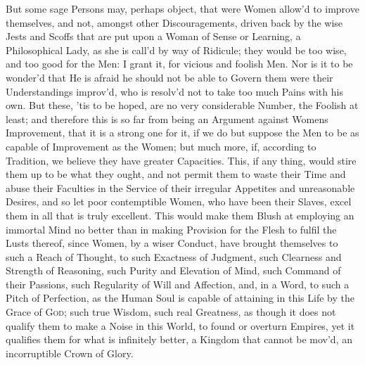 But some sage Persons may, perhaps object, that were Women allow'd to
improve themselves, and not, amongst other Discouragements, driven
back by the  wise Jests and Scoffs that are put upon a Woman
of Sense or Learning, a Philosophical Lady, as she is call'd by way of
Ridicule; they would be too wise, and too good for the Men: I grant
it, for vicious and foolish Men. Nor is it to be wonder'd that He is
afraid he should not be able to Govern them were their Understandings
improv'd, who is resolv'd not to take too much Pains with his own. But
these, 'tis to be hoped, are no very considerable Number, the Foolish
at least; and therefore this is so far from being an Argument against
Womens Improvement, that it is a strong one for it, if we do but
suppose the Men to be as capable of Improvement as the Women; but much
more, if, according to Tradition, we believe they have greater
Capacities. This, if any thing, would stire them up to be what they
ought, and not permit them to waste their Time and abuse their
Faculties in the Service of their irregular Appetites and unreasonable
Desires, and so let poor contemptible Women, who have  been
their Slaves, excel them in all that is truly excellent. This would
make them Blush at employing an immortal Mind no better than in making
Provision for the Flesh to fulfil the Lusts thereof, since Women, by a
wiser Conduct, have brought themselves to such a Reach of Thought, to
such Exactness of Judgment, such Clearness and Strength of Reasoning,
such Purity and Elevation of Mind, such Command of their Passions,
such Regularity of Will and Affection, and, in a Word, to such a Pitch
of Perfection, as the Human Soul is capable of attaining in this Life
by the Grace of \textsc{God}; such true Wisdom, such real Greatness,
as though it does not qualify them to make a Noise in this World, to
found or overturn Empires, yet it qualifies them for what is
infinitely better, a Kingdom that cannot be mov'd, an incorruptible
Crown of Glory.

